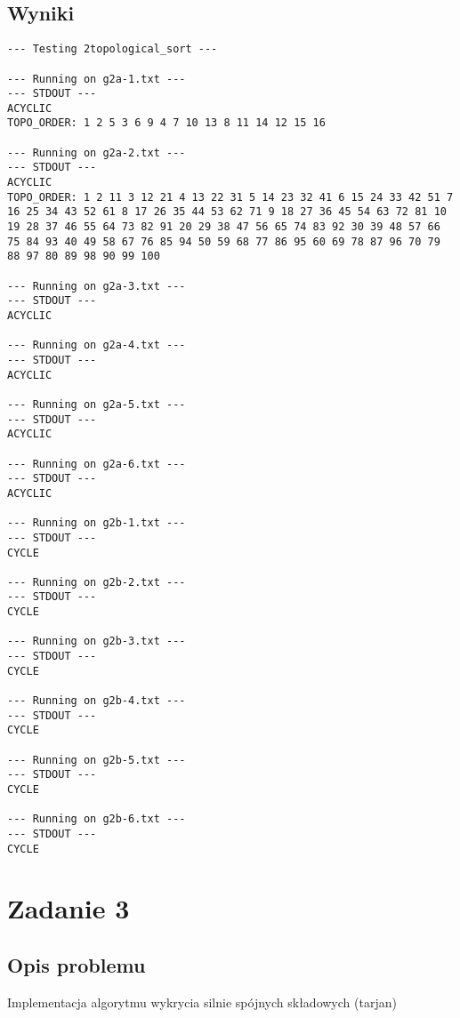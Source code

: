 \documentclass{article}
\begin{document}
\subsection{Wyniki}
\begin{verbatim}
--- Testing 2topological_sort ---

--- Running on g2a-1.txt ---
--- STDOUT ---
ACYCLIC
TOPO_ORDER: 1 2 5 3 6 9 4 7 10 13 8 11 14 12 15 16

--- Running on g2a-2.txt ---
--- STDOUT ---
ACYCLIC
TOPO_ORDER: 1 2 11 3 12 21 4 13 22 31 5 14 23 32 41 6 15 24 33 42 51 7 16 25 34 43 52 61 8 17 26 35 44 53 62 71 9 18 27 36 45 54 63 72 81 10 19 28 37 46 55 64 73 82 91 20 29 38 47 56 65 74 83 92 30 39 48 57 66 75 84 93 40 49 58 67 76 85 94 50 59 68 77 86 95 60 69 78 87 96 70 79 88 97 80 89 98 90 99 100

--- Running on g2a-3.txt ---
--- STDOUT ---
ACYCLIC

--- Running on g2a-4.txt ---
--- STDOUT ---
ACYCLIC

--- Running on g2a-5.txt ---
--- STDOUT ---
ACYCLIC

--- Running on g2a-6.txt ---
--- STDOUT ---
ACYCLIC

--- Running on g2b-1.txt ---
--- STDOUT ---
CYCLE

--- Running on g2b-2.txt ---
--- STDOUT ---
CYCLE

--- Running on g2b-3.txt ---
--- STDOUT ---
CYCLE

--- Running on g2b-4.txt ---
--- STDOUT ---
CYCLE

--- Running on g2b-5.txt ---
--- STDOUT ---
CYCLE

--- Running on g2b-6.txt ---
--- STDOUT ---
CYCLE
\end{verbatim}
\vspace{3cm}

\section{Zadanie 3}
\subsection{Opis problemu}
Implementacja algorytmu wykrycia silnie spójnych składowych (tarjan)
\end{document}
